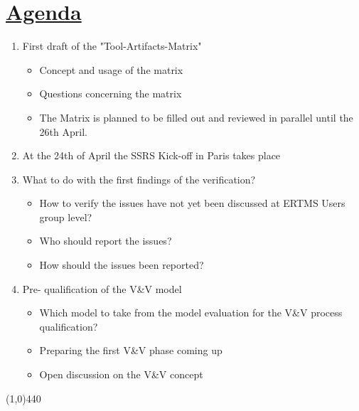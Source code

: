 \documentclass[a4paper]{article}
\begin{document}
\section*{\underline{Agenda}}
\begin{enumerate}
\item First draft of the "Tool-Artifacts-Matrix"
\begin{itemize}
\item Concept and usage of the matrix
\item Questions concerning the matrix
\item The Matrix is planned to be filled out and reviewed in parallel until the 26th April.
\end{itemize}
\item At the 24th of April the SSRS Kick-off in Paris takes place
\item What to do with the first findings of the verification? 
\begin{itemize}
\item How to verify the issues have not yet been discussed at ERTMS Users group level?
\item Who should report the issues?
\item How should the issues been reported?
\end{itemize}
\item Pre- qualification of the V\&V model 
\begin{itemize}
\item Which model to take from the model evaluation for the V\&V process qualification?
\item Preparing the first V\&V phase coming up
\item Open discussion on the V\&V concept
\end{itemize}
\end{enumerate}
\line(1,0){440}
\end{document}
